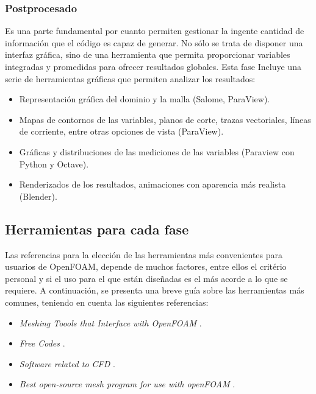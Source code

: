 \subsubsection{Postprocesado}

Es una parte fundamental por cuanto permiten gestionar la ingente
cantidad de información que el código es capaz de generar. No sólo se
trata de disponer una interfaz gráfica, sino de una herramienta que
permita proporcionar variables integradas y promedidas para ofrecer
resultados globales. Esta fase Incluye una serie de herramientas
gráficas que permiten analizar los resultados:

\begin{itemize}
\item
  Representación gráfica del dominio y la malla (Salome, ParaView).
\item
  Mapas de contornos de las variables, planos de corte, trazas
  vectoriales, líneas de corriente, entre otras opciones de vista
  (ParaView).
\item
  Gráficas y distribuciones de las mediciones de las variables
  (Paraview con Python y Octave).
\item
  Renderizados de los resultados, animaciones con aparencia más
  realista (Blender).
\end{itemize}

\subsection{Herramientas para cada fase}\label{header-n52}

Las referencias para la elección de las herramientas más convenientes
para usuarios de OpenFOAM, depende de muchos factores, entre ellos el
critério personal y si el uso para el que están diseñadas es el más
acorde a lo que se requiere. A continuación, se presenta una breve guía
sobre las herramientas más comunes, teniendo en cuenta las siguientes referencias:

\begin{itemize}
  \item
    \emph{Meshing Toools that Interface with OpenFOAM} \cite{sradl}.
  \item 
    \emph{Free Codes} \cite{codes}.
  \item 
  \emph{Software related to CFD} \cite{soft}.
  \item 
    \emph{Best open-source mesh program for use with openFOAM} \cite{maxi}.
\end{itemize}


